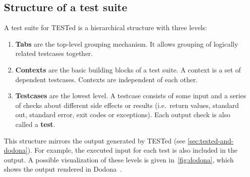 \documentclass[../main]{subfiles}
\begin{document}
\subsection{Structure of a test suite}\label{subsec:structure-of-a-test-suite}

A test suite for TESTed is a hierarchical structure with three levels:


\begin{enumerate}
    \item \textbf{Tabs} are the top-level grouping mechanism.
    It allows grouping of logically related testcases together.
    \item \textbf{Contexts} are the basic building blocks of a test suite.
    A context is a set of dependent testcases.
    Contexts are independent of each other.
    \item \textbf{Testcases} are the lowest level.
    A testcase consists of some input and a series of checks about different side effects or results (i.e.\ return values, standard out, standard error, exit codes or exceptions).
    Each output check is also called a \textbf{test}.
\end{enumerate}

This structure mirrors the output generated by TESTed (see \cref{sec:tested-and-dodona}).
For example, the executed input for each test is also included in the output.
A possible visualization of these levels is given in~\cref{fig:dodona}, which shows the output rendered in Dodona~\autocite{van_petegem_dodona_2022}.
\end{document}
